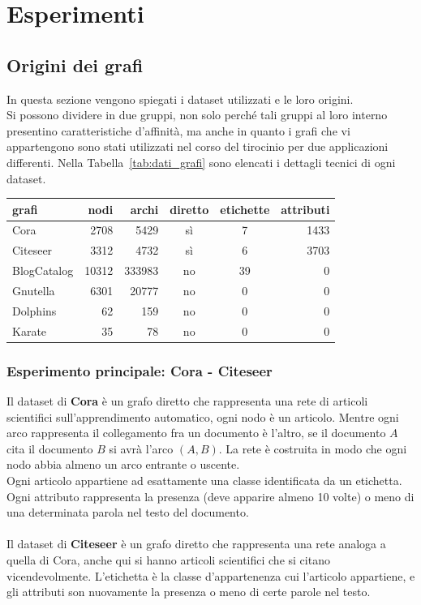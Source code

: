
%
\chapter{Esperimenti}
\section{Origini dei grafi}
In questa sezione vengono spiegati i dataset utilizzati e le loro origini.\\
Si possono dividere in due gruppi, non solo perché tali gruppi al loro interno presentino caratteristiche d'affinità, ma anche in quanto i grafi che vi appartengono sono stati utilizzati nel corso del tirocinio per due applicazioni differenti. Nella Tabella~\ref{tab:dati_grafi} sono elencati i dettagli tecnici di ogni dataset.
%
\begin{center}
	\begin{tabular}{|l|r|r|c|c|r|}
		\hline
		grafi&nodi&archi&diretto&etichette&attributi\\
		\hline
		Cora & 2708 & 5429 & sì & 7 & 1433\\
		Citeseer & 3312 & 4732 & sì & 6 & 3703\\
		\hline
		BlogCatalog & 10312 & 333983 & no & 39 & 0\\
		Gnutella & 6301 & 20777 & no & 0 & 0\\
		Dolphins & 62 & 159 & no & 0 & 0\\
		Karate & 35 & 78 & no & 0 & 0\\
		\hline
		\end{tabular}
		\label{tab:dati_grafi}
\end{center}
%
\subsection*{Esperimento principale: Cora - Citeseer}\cite{Co-Ci_1}\cite{Co-Ci_2}
Il dataset di \textbf{Cora} è un grafo diretto che rappresenta una rete di articoli scientifici sull'apprendimento automatico, ogni nodo è un articolo. Mentre ogni arco rappresenta il collegamento fra un documento è l'altro, se il documento $A$ cita il documento $B$ si avrà l'arco $(A, B)$. La rete è costruita in modo che ogni nodo abbia almeno un arco entrante o uscente.\\
Ogni articolo appartiene ad esattamente una classe identificata da un etichetta. Ogni attributo rappresenta la presenza (deve apparire almeno 10 volte) o meno di una determinata parola nel testo del documento.\\
\\
Il dataset di \textbf{Citeseer} è un grafo diretto che rappresenta una rete analoga a quella di Cora, anche qui si hanno articoli scientifici che si citano vicendevolmente. L'etichetta è la classe d'appartenenza cui l'articolo appartiene, e gli attributi son nuovamente la presenza o meno di certe parole nel testo.\\
%
